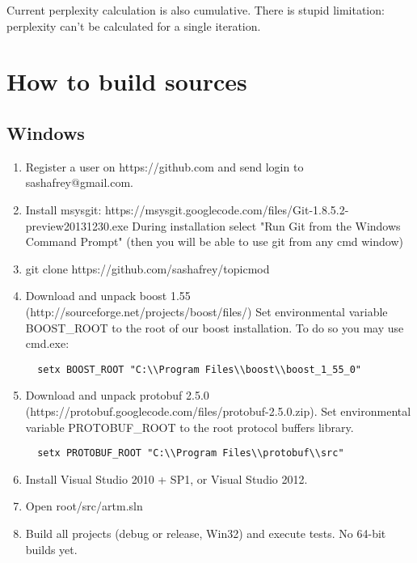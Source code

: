 \documentclass[11pt,a4paper,twoside]{report}
\begin{document}
Current perplexity calculation is also cumulative.
There is stupid limitation: perplexity can't be calculated for a single iteration.

\section{How to build sources}

\subsection{Windows}

\begin{enumerate}
\item Register a user on https://github.com and send login to sashafrey@gmail.com.
\item Install msysgit:
  https://msysgit.googlecode.com/files/Git-1.8.5.2-preview20131230.exe
   During installation select "Run Git from the Windows Command Prompt"
   (then you will be able to use git from any cmd window)
\item git clone https://github.com/sashafrey/topicmod
\item Download and unpack boost 1.55 (http://sourceforge.net/projects/boost/files/)
   Set environmental variable BOOST\_ROOT to the root of our boost installation. To do so you may use cmd.exe:
 \begin{verbatim}
  setx BOOST_ROOT "C:\\Program Files\\boost\\boost_1_55_0"
 \end{verbatim}
\item Download and unpack protobuf 2.5.0 (https://protobuf.googlecode.com/files/protobuf-2.5.0.zip).
   Set environmental variable PROTOBUF\_ROOT to the root protocol buffers library.
  \begin{verbatim}
  setx PROTOBUF_ROOT "C:\\Program Files\\protobuf\\src"
  \end{verbatim}
\item Install Visual Studio 2010 + SP1, or Visual Studio 2012.
\item Open root/src/artm.sln
\item Build all projects (debug or release, Win32) and execute tests. No 64-bit builds yet.
\end{enumerate}
\end{document}
